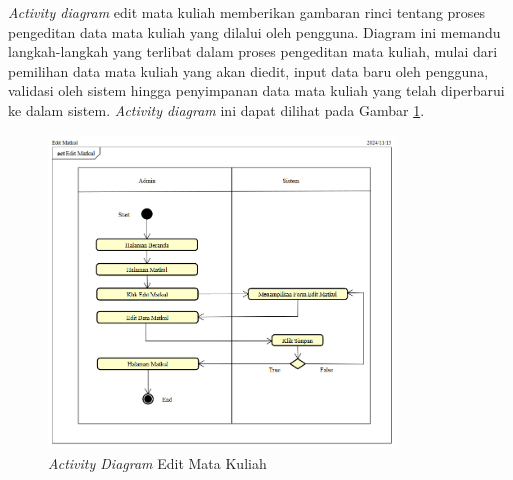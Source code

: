 \textit{Activity diagram} edit mata kuliah memberikan gambaran rinci tentang proses pengeditan data mata kuliah yang dilalui oleh pengguna. Diagram ini memandu langkah-langkah yang terlibat dalam proses pengeditan mata kuliah, mulai dari pemilihan data mata kuliah yang akan diedit, input data baru oleh pengguna, validasi oleh sistem hingga penyimpanan data mata kuliah yang telah diperbarui ke dalam sistem. \textit{Activity diagram} ini dapat dilihat pada Gambar \ref{activity-diagram-edit-matkul}.
\begin{figure}
	\centering
	\includegraphics[width=0.82\textwidth]{konten/gambar/activity-diagram/edit-matkul.png}
	\caption{\textit{Activity Diagram} Edit Mata Kuliah}
	\label{activity-diagram-edit-matkul}
\end{figure}

